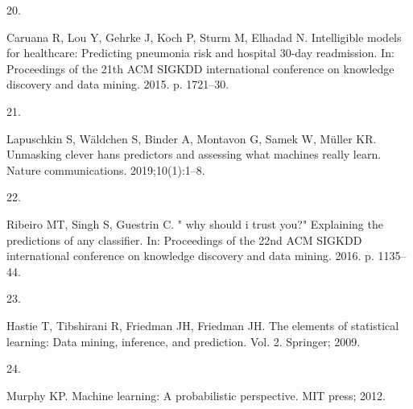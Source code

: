 \documentclass[
  10pt,
]{scrbook}
\newlength{\cslhangindent}
\newlength{\csllabelwidth}
\newlength{\cslentryspacingunit} %
\newenvironment{CSLReferences}[2] %
 {%
  \setlength{\parindent}{0pt}
  \ifodd #1
  \let\oldpar\par
  \def\par{\hangindent=\cslhangindent\oldpar}
  \fi
  \setlength{\parskip}{#2\cslentryspacingunit}
 }%
 {}
\newcommand{\CSLLeftMargin}[1]{\parbox[t]{\csllabelwidth}{#1}}
\newcommand{\CSLRightInline}[1]{\parbox[t]{\linewidth - \csllabelwidth}{#1}\break}
\begin{document}
\begin{CSLReferences}{0}{0}
\leavevmode{}%
\CSLLeftMargin{20. }
\CSLRightInline{Caruana R, Lou Y, Gehrke J, Koch P, Sturm M, Elhadad N. Intelligible models for healthcare: Predicting pneumonia risk and hospital 30-day readmission. In: Proceedings of the 21th ACM SIGKDD international conference on knowledge discovery and data mining. 2015. p. 1721--30. }

\leavevmode{}%
\CSLLeftMargin{21. }
\CSLRightInline{Lapuschkin S, Wäldchen S, Binder A, Montavon G, Samek W, Müller KR. Unmasking clever hans predictors and assessing what machines really learn. Nature communications. 2019;10(1):1--8. }

\leavevmode{}%
\CSLLeftMargin{22. }
\CSLRightInline{Ribeiro MT, Singh S, Guestrin C. " why should i trust you?" Explaining the predictions of any classifier. In: Proceedings of the 22nd ACM SIGKDD international conference on knowledge discovery and data mining. 2016. p. 1135--44. }

\leavevmode{}%
\CSLLeftMargin{23. }
\CSLRightInline{Hastie T, Tibshirani R, Friedman JH, Friedman JH. The elements of statistical learning: Data mining, inference, and prediction. Vol. 2. Springer; 2009. }

\leavevmode{}%
\CSLLeftMargin{24. }
\CSLRightInline{Murphy KP. Machine learning: A probabilistic perspective. MIT press; 2012. }

\end{CSLReferences}

\printindex
\thispagestyle{empty}
\end{document}

